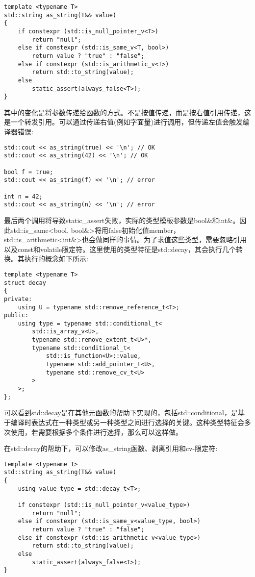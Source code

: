 \begin{lstlisting}[style=styleCXX]
template <typename T>
std::string as_string(T&& value)
{
	if constexpr (std::is_null_pointer_v<T>)
		return "null";
	else if constexpr (std::is_same_v<T, bool>)
		return value ? "true" : "false";
	else if constexpr (std::is_arithmetic_v<T>)
		return std::to_string(value);
	else
		static_assert(always_false<T>);
}
\end{lstlisting}

其中的变化是将参数传递给函数的方式。不是按值传递，而是按右值引用传递，这是一个转发引用。可以通过传递右值(例如字面量)进行调用，但传递左值会触发编译器错误:

\begin{lstlisting}[style=styleCXX]
std::cout << as_string(true) << '\n'; // OK
std::cout << as_string(42) << '\n'; // OK

bool f = true;
std::cout << as_string(f) << '\n'; // error

int n = 42;
std::cout << as_string(n) << '\n'; // error
\end{lstlisting}

最后两个调用将导致static\_assert失败，实际的类型模板参数是bool\&和int\&。因此std::is\_same<bool, bool\&>将用false初始化值member，std::is\_arithmetic<int\&>也会做同样的事情。为了求值这些类型，需要忽略引用以及const和volatile限定符。这里使用的类型特征是std::decay，其会执行几个转换。其执行的概念如下所示:

\begin{lstlisting}[style=styleCXX]
template <typename T>
struct decay
{
private:
	using U = typename std::remove_reference_t<T>;
public:
	using type = typename std::conditional_t<
		std::is_array_v<U>,
		typename std::remove_extent_t<U>*,
		typename std::conditional_t<
			std::is_function<U>::value,
			typename std::add_pointer_t<U>,
			typename std::remove_cv_t<U>
		>
	>;
};
\end{lstlisting}

可以看到std::decay是在其他元函数的帮助下实现的，包括std::conditional，是基于编译时表达式在一种类型或另一种类型之间进行选择的关键。这种类型特征会多次使用，若需要根据多个条件进行选择，那么可以这样做。

在std::decay的帮助下，可以修改as\_string函数、剥离引用和cv-限定符:

\begin{lstlisting}[style=styleCXX]
template <typename T>
std::string as_string(T&& value)
{
	using value_type = std::decay_t<T>;
	
	if constexpr (std::is_null_pointer_v<value_type>)
		return "null";
	else if constexpr (std::is_same_v<value_type, bool>)
		return value ? "true" : "false";
	else if constexpr (std::is_arithmetic_v<value_type>)
		return std::to_string(value);
	else
		static_assert(always_false<T>);
}
\end{lstlisting}


